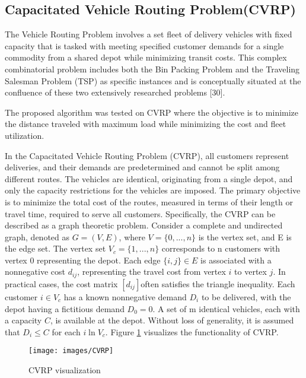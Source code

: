 \documentclass[conference]{IEEEtran}
\begin{document}
\begin{abstract1}
\section{Capacitated Vehicle Routing Problem(CVRP) }
The Vehicle Routing Problem involves a set fleet of delivery vehicles with fixed capacity that is tasked with meeting specified customer demands for a single commodity from a shared depot while minimizing transit costs. This complex combinatorial problem includes both the Bin Packing Problem and the Traveling Salesman Problem (TSP) as specific instances and is conceptually situated at the confluence of these two extensively researched problems [30].

The proposed algorithm was tested on CVRP where the objective is to minimize the distance traveled with maximum load while minimizing the cost and fleet utilization.

In the Capacitated Vehicle Routing Problem (CVRP), all customers represent deliveries, and their demands are predetermined and cannot be split among different routes. The vehicles are identical, originating from a single depot, and only the capacity restrictions for the vehicles are imposed. The primary objective is to minimize the total cost of the routes, measured in terms of their length or travel time, required to serve all customers. Specifically, the CVRP can be described as a graph theoretic problem.
Consider a complete and undirected graph, denoted as $G=(V,E)$, where $V=\{0,...,n\}$ is the vertex set, and E is the edge set. The vertex set $V_{c}=\{1,...,n\}$ corresponds to n customers with vertex 0 representing the depot. Each edge $\{i,j\}\in E$ is associated with a nonnegative cost $d_{ij}$, representing the travel cost from vertex $i$ to vertex $j$. In practical cases, the cost matrix $[d_{ij}]$often satisfies the triangle inequality. Each customer $i\in V_{c}$ has a known nonnegative demand $D_{i}$ to be delivered, with the depot having a fictitious demand $D_{0}=0$. A set of m identical vehicles, each with a capacity $C$, is available at the depot. Without loss of generality, it is assumed that $D_{i} \leq C$ for each $i \ln V_{c}  $. Figure \ref{CVRP} visualizes the functionality of CVRP.

\begin{figure}[htbp]
	\centerline{\texttt{[image: images/CVRP]}}
	\caption{CVRP visualization}
	\label{CVRP}
\end{figure}




\end{abstract1}
\end{document}

